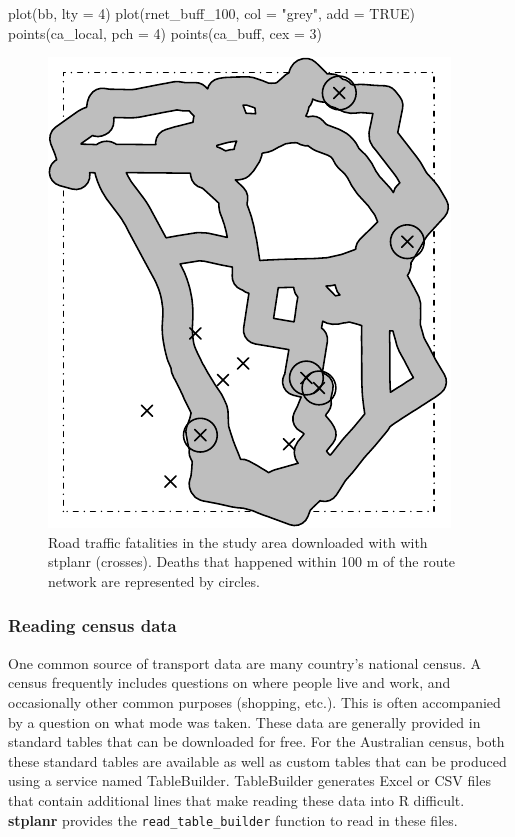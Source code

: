 \begin{Schunk}
\begin{Sinput}
plot(bb, lty = 4)
plot(rnet_buff_100, col = "grey", add = TRUE)
points(ca_local, pch = 4)
points(ca_buff, cex = 3)
\end{Sinput}
\begin{figure}

{\centering \includegraphics[width=0.5\linewidth]{fats-1}

}

\caption[Road traffic fatalities in the study area downloaded with with stplanr (crosses)]{Road traffic fatalities in the study area downloaded with with stplanr (crosses). Deaths that happened within 100 m of the route network are represented by circles.}\label{fig:fats}
\end{figure}
\end{Schunk}

\subsubsection{Reading census data} \label{reading-census-data}

One common source of transport data are many country's national census.
A census frequently includes questions on where people live and work, and occasionally other common purposes (shopping, etc.).
This is often accompanied by a question on what mode was taken.
These data are generally provided in standard tables that can be downloaded for free.
For the Australian census, both these standard tables are available as well as custom tables that can be produced using a service named TableBuilder.
TableBuilder generates Excel or CSV files that contain additional lines that make reading these data into R difficult.
\textbf{stplanr} provides the \texttt{read\_table\_builder} function to read in these files.

